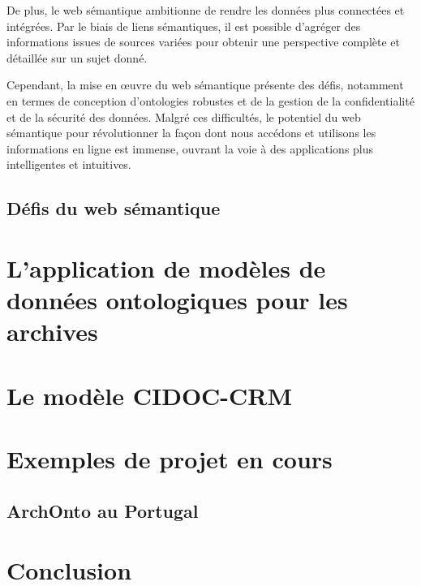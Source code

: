 \documentclass[12pt]{report}
\begin{document}
De plus, le web sémantique ambitionne de rendre les données plus connectées et intégrées. Par le biais de liens sémantiques, il est possible d'agréger des informations issues de sources variées pour obtenir une perspective complète et détaillée sur un sujet donné.

Cependant, la mise en œuvre du web sémantique présente des défis, notamment en termes de conception d'ontologies robustes et de la gestion de la confidentialité et de la sécurité des données. Malgré ces difficultés, le potentiel du web sémantique pour révolutionner la façon dont nous accédons et utilisons les informations en ligne est immense, ouvrant la voie à des applications plus intelligentes et intuitives.
\subsection{Défis du web sémantique}
\section{L'application de modèles de données ontologiques pour les archives}
\section{Le modèle CIDOC-CRM}
\section{Exemples de projet en cours}
\subsection{ArchOnto au Portugal}
\section{Conclusion}
\end{document}
